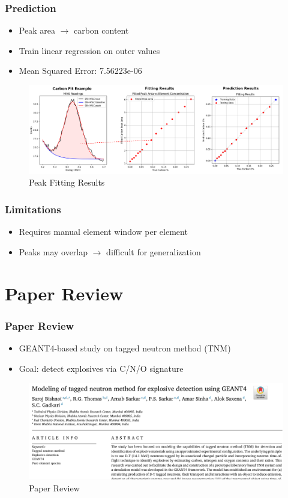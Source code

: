 \documentclass[xcolor=dvipsnames,envcountsect]{beamer}
\begin{document}
\begin{frame}
  \frametitle{Prediction}
  \begin{itemize}
    \item Peak area $\rightarrow$ carbon content
    \item Train linear regression on outer values
    \item Mean Squared Error: 7.56223e-06
  \end{itemize}
  \begin{figure}
      \centering
      \includegraphics[width=\linewidth]{Figures/peakfitresults.png}
      \caption{Peak Fitting Results}
      \label{fig:peakfitresults}
  \end{figure}
\end{frame}

\begin{frame}
  \frametitle{Limitations}
  \begin{itemize}
    \item Requires manual element window per element
    \item Peaks may overlap $\rightarrow$ difficult for generalization
  \end{itemize}
\end{frame}

\section{Paper Review}
\begin{frame}
  \frametitle{Paper Review}
  \begin{itemize}
    \item GEANT4-based study on tagged neutron method (TNM)
    \item Goal: detect explosives via C/N/O signature
  \end{itemize}
  \begin{figure}
      \centering
      \includegraphics[width=\linewidth]{Figures/paperreview.png}
      \caption{Paper Review}
      \label{fig:paperreview}
  \end{figure}
\end{frame}
\end{document}
